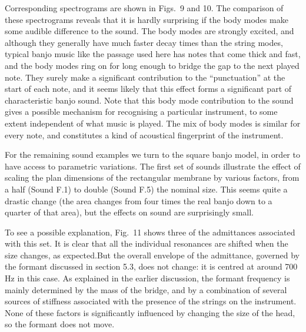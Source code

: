   Corresponding spectrograms are shown in Figs.\ 9 and 10. The comparison of 
  these spectrograms reveals that it is hardly surprising if the body modes 
  make some audible difference to the sound. The body modes are strongly 
  excited, and although they generally have much faster decay times than the 
  string modes, typical banjo music like the passage used here has notes that 
  come thick and fast, and the body modes ring on for long enough to bridge the 
  gap to the next played note. They surely make a significant contribution to 
  the ``punctuation'' at the start of each note, and it seems likely that this 
  effect forms a significant part of characteristic banjo sound. Note that this 
  body mode contribution to the sound gives a possible mechanism for 
  recognising a particular instrument, to some extent independent of what music 
  is played. The mix of body modes is similar for every note, and constitutes a 
  kind of acoustical fingerprint of the instrument. 




  For the remaining sound examples we turn to the square banjo model, in order 
  to have access to parametric variations. The first set of sounds illustrate 
  the effect of scaling the plan dimensions of the rectangular membrane by 
  various factors, from a half (Sound F.1) to double (Sound F.5) the nominal 
  size. This seems quite a drastic change (the area changes from four times the 
  real banjo down to a quarter of that area), but the effects on sound are 
  surprisingly small. 

  To see a possible explanation, Fig.\ 11 shows three of the admittances 
  associated with this set. It is clear that all the individual resonances are 
  shifted when the size changes, as expected.But the overall envelope of the 
  admittance, governed by the formant discussed in section 5.3, does not 
  change: it is centred at around 700 Hz in this case. As explained in the 
  earlier discussion, the formant frequency is mainly determined by the mass of 
  the bridge, and by a combination of several sources of stiffness associated 
  with the presence of the strings on the instrument. None of these factors is 
  significantly influenced by changing the size of the head, so the formant 
  does not move. 

